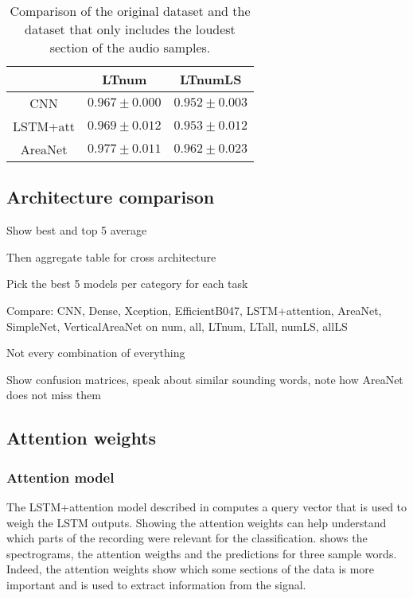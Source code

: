 \begin{table}[t!]
    \centering
    \caption{Comparison of the original dataset and the dataset that only
    includes the loudest section of the audio samples.}
    \label{tab:comparison_loud_section}
    \begin{tabular}{|c|c|c|}
        \hline
        & LTnum & LTnumLS \\
        \hline
        CNN      & $0.967 \pm 0.000$ & $0.952 \pm 0.003$ \\
        LSTM+att & $0.969 \pm 0.012$ & $0.953 \pm 0.012$ \\
        AreaNet  & $0.977 \pm 0.011$ & $0.962 \pm 0.023$ \\
        \hline
    \end{tabular}
\end{table}

\subsection{Architecture comparison}

Show best and top 5 average

Then aggregate table for cross architecture

Pick the best 5 models per category for each task

Compare: CNN, Dense, Xception, EfficientB047, LSTM+attention, AreaNet, SimpleNet,
VerticalAreaNet on num, all, LTnum, LTall, numLS, allLS

Not every combination of everything

Show confusion matrices, speak about similar sounding words, note how AreaNet
does not miss them

\subsection{Attention weights}

\subsubsection{Attention model}


The LSTM+attention model described in  computes a query
vector that is used to weigh the LSTM outputs. Showing the attention weights
can help understand which parts of the recording were relevant for the
classification.
 shows the spectrograms, the attention
weigths and the predictions for three sample words.
Indeed, the attention weights show which some sections of the data is more important
and is used to extract information from the signal.

